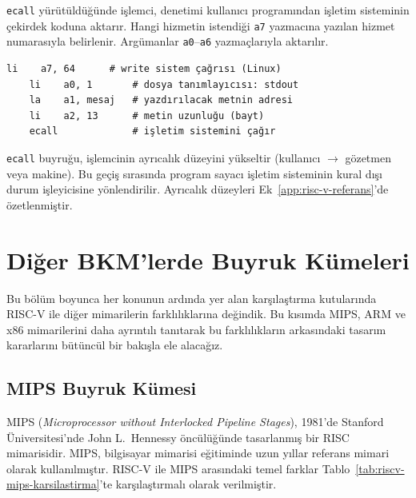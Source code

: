 \texttt{ecall} yürütüldüğünde işlemci, denetimi kullanıcı programından işletim sisteminin çekirdek koduna aktarır. Hangi hizmetin istendiği \texttt{a7} yazmacına yazılan hizmet numarasıyla belirlenir. Argümanlar \texttt{a0}--\texttt{a6} yazmaçlarıyla aktarılır.

\begin{lstlisting}[style=riscv]
    li    a7, 64      # write sistem çağrısı (Linux)
    li    a0, 1       # dosya tanımlayıcısı: stdout
    la    a1, mesaj   # yazdırılacak metnin adresi
    li    a2, 13      # metin uzunluğu (bayt)
    ecall             # işletim sistemini çağır
\end{lstlisting}

\begin{bilginot}
\texttt{ecall} buyruğu, işlemcinin ayrıcalık düzeyini yükseltir (kullanıcı $\to$ gözetmen veya makine). Bu geçiş sırasında program sayacı işletim sisteminin kural dışı durum işleyicisine yönlendirilir. Ayrıcalık düzeyleri Ek~\ref{app:risc-v-referans}'de özetlenmiştir.
\end{bilginot}

\section{Diğer BKM'lerde Buyruk Kümeleri}
\label{sec:diger-isa}

Bu bölüm boyunca her konunun ardında yer alan karşılaştırma kutularında RISC-V ile diğer mimarilerin farklılıklarına değindik. Bu kısımda MIPS, ARM ve x86 mimarilerini daha ayrıntılı tanıtarak bu farklılıkların arkasındaki tasarım kararlarını bütüncül bir bakışla ele alacağız.


\subsection{MIPS Buyruk Kümesi}

MIPS (\textit{Microprocessor without Interlocked Pipeline Stages}), 1981'de Stanford Üniversitesi'nde John L.\ Hennessy öncülüğünde tasarlanmış bir RISC mimarisidir. MIPS, bilgisayar mimarisi eğitiminde uzun yıllar referans mimari olarak kullanılmıştır. RISC-V ile MIPS arasındaki temel farklar Tablo~\ref{tab:riscv-mips-karsilastirma}'te karşılaştırmalı olarak verilmiştir.

